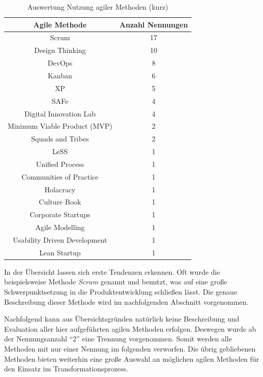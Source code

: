 \begin{table}[ht]
	\centering
	\caption{Auswertung Nutzung agiler Methoden (kurz)}
	\begin{tabular}{|c|c|}
		\hline
		\textbf{Agile Methode}& \textbf{Anzahl Nennungen} \\
		\hline
		Scrum                          & 17               \\
		Design Thinking                & 10               \\
		DevOps                         & 8                \\
		Kanban                         & 6                \\
		XP                             & 5                \\
		SAFe                           & 4                \\
		Digital Innovation Lab         & 4                \\
		Minimum Viable Product (MVP) & 2                \\
		Squads and Tribes              & 2                \\
		LeSS                           & 1                \\
		Unified Process                & 1                \\
		Communities of Practice        & 1                \\
		Holacracy                      & 1                \\
		Culture Book                   & 1                \\
		Corporate Startups             & 1                \\
		Agile Modelling                & 1                \\
		Usability Driven Development   & 1                \\
		Lean Startup                   & 1               \\
		\hline
	\end{tabular}
	\label{tab:clusteringagileshort}
\end{table}

In der Übersicht lassen sich erste Tendenzen erkennen. Oft wurde die beispielsweise Methode \textit{Scrum} genannt und benutzt, was auf eine große Schwerpunktsetzung in die Produktentwicklung schließen lässt. Die genaue Beschreibung dieser Methode wird im nachfolgenden Abschnitt vorgenommen. 

Nachfolgend kann aus Übersichtsgründen natürlich keine Beschreibung und Evaluation aller hier aufgeführten agilen Methoden erfolgen. Deswegen wurde ab der  Nennungsanzahl ``2'' eine Trennung vorgenommen. Somit werden alle Methoden mit nur einer Nennung im folgenden verworfen. Die übrig gebliebenen Methoden bieten weiterhin eine große Auswahl an möglichen agilen Methoden für den Einsatz im Transformationsprozess. 

